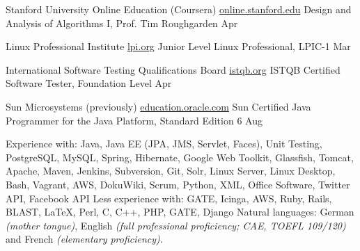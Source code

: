 \documentclass[10pt,a4paper]{article}
\begin{document}
\headedsection
  {Stanford University Online Education (Coursera)}
  {\href{http://online.stanford.edu/courses}{online.stanford.edu}} {%
  \headedsubsection
    {Design and Analysis of Algorithms I, Prof. Tim Roughgarden}
    {Apr }
    {}
}

\headedsection
  {Linux Professional Institute}
  {\href{https://www.lpi.org/linux-certifications/programs}{lpi.org}} {%
  \headedsubsection
    {Junior Level Linux Professional, LPIC-1}
    {Mar }
    {}
}

\headedsection
  {International Software Testing Qualifications Board}
  {\href{http://www.istqb.org/certification-path-root/foundation-level/foundation-level-content.html}{istqb.org}} {%
  \headedsubsection
    {ISTQB Certified Software Tester,  Foundation Level}
    {Apr }
    {}
}

\headedsection
  {Sun Microsystems (previously)}
  {\href{http://education.oracle.com/}{education.oracle.com}} {%
  \headedsubsection
    {Sun Certified Java Programmer for the Java Platform, Standard Edition 6}
    {Aug }
    {}
}

\spacedhrule{0.8em}{-0.4em}


\inlineheadsection  %
  {Experience with:}
  {Java, Java EE (JPA, JMS, Servlet, Faces), Unit Testing, PostgreSQL, MySQL, Spring, Hibernate, Google Web Toolkit, Glassfish, Tomcat, Apache, Maven, Jenkins, Subversion, Git, Solr, Linux Server, Linux Desktop, Bash, Vagrant, AWS, DokuWiki, Scrum, Python, XML, Office Software, Twitter API, Facebook API}
\vspace{0.5em}
\inlineheadsection
  {Less experience with:}
  {GATE, Icinga, AWS, Ruby, Rails, BLAST, LaTeX, Perl, C, C++, PHP, GATE, Django}
\vspace{0.5em}
\inlineheadsection
  {Natural languages:}
  {German \emph{(mother tongue)}, English \emph{(full professional proficiency; CAE, TOEFL 109/120)} and French \emph{(elementary proficiency)}.}
\end{document}
